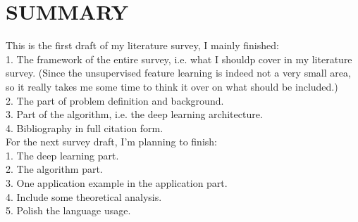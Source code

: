 \documentclass[conference]{IEEEtran}
\begin{document}
\section{SUMMARY}

This is the first draft of my literature survey, I mainly finished: \\
1. The framework of the entire survey, i.e. what I shouldp cover in my literature survey. (Since the unsupervised feature learning is indeed not a very small area, so it really takes me some time to think it over on what should be included.) \\
2. The part of problem definition and background. \\
3. Part of the algorithm, i.e. the deep learning architecture. \\
4. Bibliography in full citation form. \\

For the next survey draft, I'm planning to finish: \\
1. The deep learning part. \\
2. The algorithm part. \\
3. One application example in the application part. \\
4. Include some theoretical analysis. \\
5. Polish the language usage.

\end{document}
